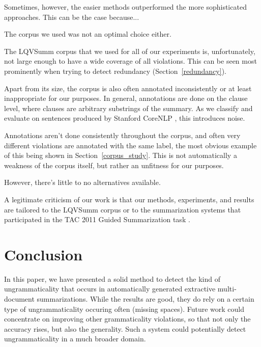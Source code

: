 \documentclass[a4paper,10pt]{scrartcl}
\theoremstyle{style}
\begin{document}
Sometimes, however, the easier methods outperformed the more sophisticated approaches. This can be the case because...


The corpus we used was not an optimal choice either.

The LQVSumm corpus that we used for all of our experiments is, unfortunately, not large enough to have a wide coverage of all violations. This can be seen most prominently when trying to detect redundancy (Section~\ref{redundancy}).

Apart from its size, the corpus is also often annotated inconsistently or at least inappropriate for our purposes. In general, annotations are done on the clause level, where clauses are arbitrary substrings of the summary. As we classify and evaluate on sentences produced by Stanford CoreNLP \citep{manning-EtAl:2014:P14-5}, this introduces noise.

Annotations aren't done consistently throughout the corpus, and often very different violations are annotated with the same label, the most obvious example of this being shown in Section~\ref{corpus_study}. This is not automatically a weakness of the corpus itself, but rather an unfitness for our purposes.

However, there's little to no alternatives available.

A legitimate criticism of our work is that our methods, experiments, and results are tailored to the LQVSumm corpus or to the summarization systems that participated in the TAC 2011 Guided Summarization task \citep{owczarzak2011overview}.



\section{Conclusion} %
\label{conclusion}

In this paper, we have presented a solid method to detect the kind of ungrammaticality that occurs in automatically generated extractive multi-document summarizations. While the results are good, they do rely on a certain type of ungrammaticality occuring often (missing spaces). Future work could concentrate on improving other grammaticality violations, so that not only the accuracy rises, but also the generality. Such a system could potentially detect ungrammaticality in a much broader domain.
\end{document}
